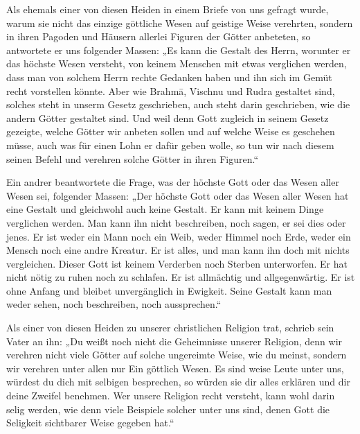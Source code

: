 \documentclass{article}
\begin{document}
Als ehemals einer von diesen Heiden in einem Briefe von uns gefragt wurde, warum sie nicht das einzige göttliche Wesen auf geistige Weise verehrten, sondern in ihren Pagoden und Häusern allerlei Figuren der Götter anbeteten, so antwortete er uns folgender Massen: „Es kann die Gestalt des Herrn, worunter er das höchste Wesen versteht, von keinem Menschen mit etwas verglichen werden, dass man von solchem Herrn rechte Gedanken haben und ihn sich im Gemüt recht vorstellen könnte. Aber wie Brahm\={a}, Vischnu und Rudra gestaltet sind, solches steht in unserm Gesetz geschrieben, auch steht darin geschrieben, wie die andern Götter gestaltet sind. Und weil denn Gott zugleich in seinem Gesetz gezeigte, welche Götter wir anbeten sollen und auf welche Weise es geschehen müsse, auch was für einen Lohn er dafür geben wolle, so tun wir nach diesem seinen Befehl und verehren solche Götter in ihren Figuren.“

Ein andrer beantwortete die Frage, was der höchste Gott oder das Wesen aller Wesen sei, folgender Massen: „Der höchste Gott oder das Wesen aller Wesen hat eine Gestalt und gleichwohl auch keine Gestalt. Er kann mit keinem Dinge verglichen werden. Man kann ihn nicht beschreiben, noch sagen, er sei dies oder jenes. Er ist weder ein Mann noch ein Weib, weder Himmel noch Erde, weder ein Mensch noch eine andre Kreatur. Er ist alles, und man kann ihn doch mit nichts vergleichen. Dieser Gott ist keinem Verderben noch Sterben unterworfen. Er hat nicht nötig zu ruhen noch zu schlafen. Er ist allmächtig und allgegenwärtig. Er ist ohne Anfang und bleibet unvergänglich in Ewigkeit. Seine Gestalt kann man weder sehen, noch beschreiben, noch aussprechen.“

Als einer von diesen Heiden zu unserer christlichen Religion trat, schrieb sein Vater an ihn: „Du weißt noch nicht die Geheimnisse unserer Religion, denn wir verehren nicht viele Götter auf solche ungereimte Weise, wie du meinst, sondern wir verehren unter allen nur Ein göttlich Wesen. Es sind weise Leute unter uns, würdest du dich mit selbigen besprechen, so würden sie dir alles erklären und dir deine Zweifel benehmen. Wer unsere Religion recht versteht, kann wohl darin selig werden, wie denn viele Beispiele solcher unter uns sind, denen Gott die Seligkeit sichtbarer Weise gegeben hat.“
\end{document}
